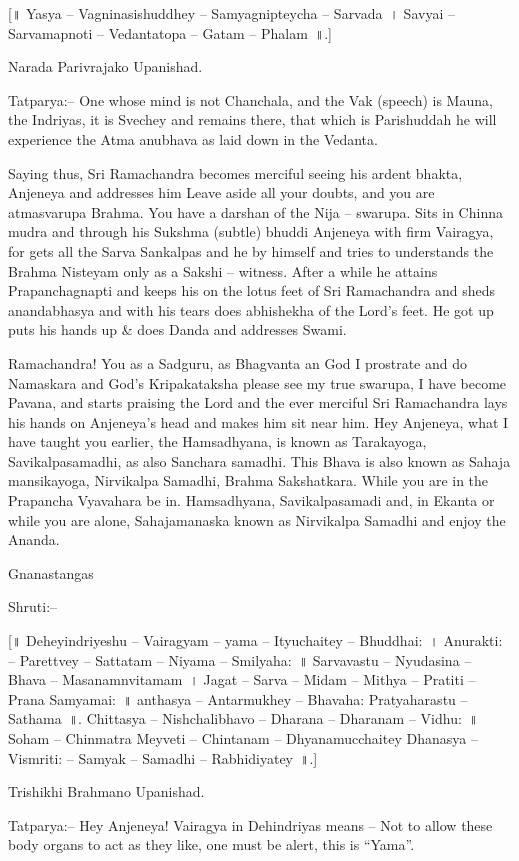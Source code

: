 [॥ Yasya – Vagninasishuddhey – Samyagnipteycha – Sarvada~। Savyai – Sarvamapnoti – Vedantatopa – Gatam – Phalam~॥.]

Narada Parivrajako Upanishad.

Tatparya:– One whose mind is not Chanchala, and the Vak (speech) is Mauna, the Indriyas, it is Svechey and remains there, that which is Parishuddah he will experience the Atma anubhava as laid down in the Vedanta.

Saying thus, Sri Ramachandra becomes merciful seeing his ardent bhakta, Anjeneya and addresses him Leave aside all your doubts, and you are atmasvarupa Brahma. You have a darshan of the Nija – swarupa. Sits in Chinna mudra and through his Sukshma (subtle) bhuddi Anjeneya with firm Vairagya, for gets all the Sarva Sankalpas and he by himself and tries to understands the Brahma Nisteyam only as a Sakshi – witness. After a while he attains Prapanchagnapti and keeps his on the lotus feet of Sri Ramachandra and sheds anandabhasya and with his tears does abhishekha of the Lord's feet. He got up puts his hands up \& does Danda and addresses Swami.

Ramachandra! You as a Sadguru, as Bhagvanta an God I prostrate and do Namaskara and God's Kripakataksha please see my true swarupa, I have become Pavana, and starts praising the Lord and the ever merciful Sri Ramachandra lays his hands on Anjeneya's head and makes him sit near him. Hey Anjeneya, what I have taught you earlier, the Hamsadhyana, is known as Tarakayoga, Savikalpasamadhi, as also Sanchara samadhi. This Bhava is also known as Sahaja mansikayoga, Nirvikalpa Samadhi, Brahma Sakshatkara. While you are in the Prapancha Vyavahara be in. Hamsadhyana, Savikalpasamadi and, in Ekanta or while you are alone, Sahajamanaska known as Nirvikalpa Samadhi and enjoy the Ananda.

Gnanastangas

Shruti:–

[॥ Deheyindriyeshu – Vairagyam – yama – Ityuchaitey – Bhuddhai:~। Anurakti: – Parettvey – Sattatam – Niyama – Smilyaha:~॥ Sarvavastu – Nyudasina – Bhava – Masanamnvitamam~। Jagat – Sarva – Midam – Mithya – Pratiti – Prana Samyamai:~॥ anthasya – Antarmukhey – Bhavaha: Pratyaharastu – Sathama~॥. Chittasya – Nishchalibhavo – Dharana – Dharanam – Vidhu:~॥ Soham – Chinmatra Meyveti – Chintanam – Dhyanamucchaitey Dhanasya – Vismriti: – Samyak – Samadhi – Rabhidiyatey~॥.]

Trishikhi Brahmano Upanishad.

Tatparya:– Hey Anjeneya! Vairagya in Dehindriyas means – Not to allow these body organs to act as they like, one must be alert, this is “Yama”.

